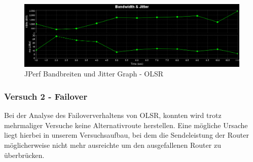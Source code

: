 \documentclass[10pt]{scrartcl}
\begin{document}
\begin{figure}[htbp]
	\centering	\includegraphics[width=1.0\textwidth]{Grafiken/OLSR_TX1_Grafik.png}
	\caption{JPerf Bandbreiten und Jitter Graph - OLSR}
	\label{fig:JPerf_OLSR_Graph}
\end{figure} 

\subsubsection{Versuch 2 - Failover}
Bei der Analyse des Failoververhaltens von OLSR, konnten wird trotz mehrmaliger Versuche keine Alternativroute herstellen. Eine mögliche Ursache liegt hierbei in unserem Versuchsaufbau, bei dem die Sendeleistung der Router möglicherweise nicht mehr ausreichte um den ausgefallenen Router zu überbrücken.
\end{document}
